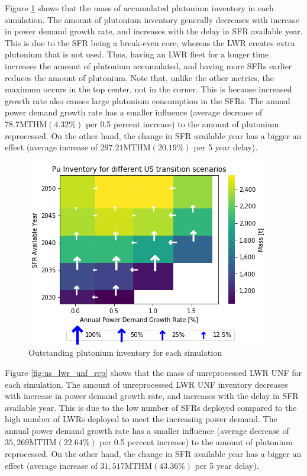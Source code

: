 Figure \ref{fig:us_pu_inv} shows that the mass of accumulated
plutonium inventory in each simulation. 
The amount of plutonium inventory generally decreases with increase
in power demand growth rate, and increases with the delay in
\gls{SFR} available year. This is due to the \gls{SFR} being a
break-even core, whereas the \gls{LWR} creates extra plutonium
that is not used. Thus, having an \gls{LWR} fleet for a longer
time increases the amount of plutonium accumulated, and having
more \glspl{SFR} earlier reduces the amount of plutonium. 
Note that, unlike the other metrics, the maximum occurs in
the top center, not in the corner. This is because increased growth rate
also causes large plutonium consumption in the \glspl{SFR}. The annual power demand
growth rate has a smaller influence (average decrease of $78.7 \text{MTHM} (4.32 \%)$ 
per 0.5 percent increase) to the amount of plutonium
reprocessed. On the other hand, the change in  \gls{SFR} available year
has a bigger an effect (average increase of $297.21 \text{MTHM} (20.19\%)$
per 5 year delay).


\begin{figure}[htbp!]
    \begin{center}
        \includegraphics[scale=0.7]{./images/us/scat_both_Pu_Inventory.png}
    \end{center}
        \caption{Outstanding plutonium inventory for each simulation}
    \label{fig:us_pu_inv}
\end{figure}

Figure \ref{fig:us_lwr_unf_rep} shows that the mass of unreprocessed \gls{LWR} \gls{UNF} for each simulation. 
The amount of unreprocessed \gls{LWR} \gls{UNF} inventory decreases with increase
in power demand growth rate, and increases with the delay in
\gls{SFR} available year. This is due to the low number of 
\glspl{SFR} deployed compared to the high number of \glspl{LWR} deployed to meet the increasing power demand.  The annual power demand
growth rate has a smaller influence (average decrease of $35,269 \text{MTHM} (22.64 \%)$ 
per 0.5 percent increase) to the amount of plutonium
reprocessed. On the other hand, the change in  \gls{SFR} available year
has a bigger an effect (average increase of $31,517 \text{MTHM} (43.36\%)$
per 5 year delay). 

